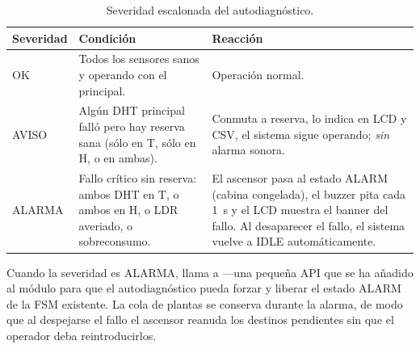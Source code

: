 \begin{table}[H]
  \centering
  \small
  \begin{tabular}{p{} p{} p{}}
    \toprule
    \textbf{Severidad} & \textbf{Condición} & \textbf{Reacción} \\
    \midrule
    \textsf{OK}     & Todos los sensores sanos y operando con el principal.
                    & Operación normal. \\
    \textsf{AVISO}  & Algún DHT principal falló pero hay reserva sana
                      (sólo en T, sólo en H, o en ambas).
                    & Conmuta a reserva, lo indica en LCD y CSV, el sistema
                      sigue operando; \emph{sin} alarma sonora. \\
    \textsf{ALARMA} & Fallo crítico sin reserva: ambos DHT en T,
                      o ambos en H, o LDR averiado, o sobreconsumo.
                    & El ascensor pasa al estado \textsf{ALARM} (cabina
                      congelada), el buzzer pita cada
                      \SI{1}{\second} y el LCD muestra el banner del fallo.
                      Al desaparecer el fallo, el sistema vuelve a
                      \textsf{IDLE} automáticamente. \\
    \bottomrule
  \end{tabular}
  \caption{Severidad escalonada del autodiagnóstico.}
  \label{tab:severidad}
\end{table}

Cuando la severidad es \textsf{ALARMA},  llama a
 ---una pequeña API que se ha añadido al
módulo  para que el autodiagnóstico pueda forzar y liberar
el estado \textsf{ALARM} de la FSM existente. La cola de plantas se conserva
durante la alarma, de modo que al despejarse el fallo el ascensor reanuda
los destinos pendientes sin que el operador deba reintroducirlos.
